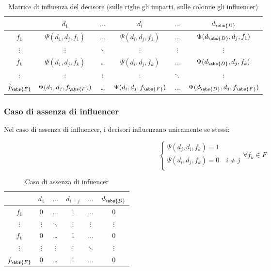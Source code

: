 \documentclass[\main/main.tex]{subfiles}
\begin{document}
\begin{table}
	\begin{tabular}{|c|c|c|c|c|c|}
		\hline
		              & $d_1$                         & $\ldots$ & $d_i$                         & $\ldots$ & $d_{\abs{D}}$                         \\
		\hline
		$f_1$         & $\Psi(d_1, d_j, f_1)$         & $\ldots$ & $\Psi(d_i, d_j, f_1)$         & $\ldots$ & $\Psi(d_{\abs{D}}, d_j, f_1)$         \\
		\hline
		$\vdots$      & $\vdots$                      & $\ddots$ & $\vdots$                      & $\vdots$ & $\vdots$                              \\
		\hline
		$f_k$         & $\Psi(d_1, d_j, f_k)$         & \ldots   & $\Psi(d_i, d_j, f_k)$         & $\ldots$ & $\Psi(d_{\abs{D}}, d_j, f_k)$         \\
		\hline
		$\vdots$      & $\vdots$                      & $\vdots$ & $\vdots$                      & $\ddots$ & $\vdots$                              \\
		\hline
		$f_{\abs{F}}$ & $\Psi(d_1, d_j, f_{\abs{F}})$ & \ldots   & $\Psi(d_i, d_j, f_{\abs{F}})$ & $\ldots$ & $\Psi(d_{\abs{D}}, d_j, f_{\abs{F}})$ \\
		\hline
	\end{tabular}
	\caption{Matrice di influenza del decisore (sulle righe gli impatti, sulle colonne gli influencer)}
\end{table}

\subsubsection{Caso di assenza di influencer}
Nel caso di assenza di influencer, i decisori influenzano unicamente se stessi:

\[
	\begin{cases}
		\Psi(d_j, d_i, f_k) = 1                \\
		\Psi(d_i, d_j, f_k) = 0 \quad i \neq j \\
	\end{cases}
	\forall f_k \in F
\]

\begin{table}
	\begin{tabular}{|c|c|c|c|c|c|}
		\hline
		              & $d_1$    & $\ldots$ & $d_{i=j}$ & $\ldots$ & $d_{\abs{D}}$ \\
		\hline
		$f_1$         & 0        & $\ldots$ & 1         & $\ldots$ & 0             \\
		\hline
		$\vdots$      & $\vdots$ & $\ddots$ & $\vdots$  & $\vdots$ & $\vdots$      \\
		\hline
		$f_k$         & 0        & \ldots   & 1         & $\ldots$ & 0             \\
		\hline
		$\vdots$      & $\vdots$ & $\vdots$ & $\vdots$  & $\ddots$ & $\vdots$      \\
		\hline
		$f_{\abs{F}}$ & 0        & \ldots   & 1         & $\ldots$ & 0             \\
		\hline
	\end{tabular}
	\caption{Caso di assenza di infuencer}
\end{table}
\end{document}
